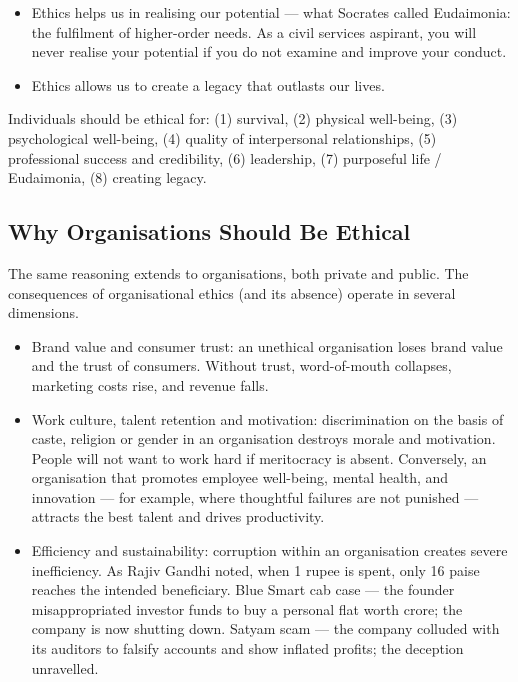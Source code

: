 \begin{KeyConcept}
\begin{itemize}
\item Ethics helps us in realising our potential --- what Socrates called Eudaimonia: the fulfilment of higher-order needs. As a civil services aspirant, you will never realise your potential if you do not examine and improve your conduct.
\item Ethics allows us to create a legacy that outlasts our lives.
\end{itemize}
\end{KeyConcept}

\begin{QuickRevision}
Individuals should be ethical for: (1) survival, (2) physical well-being, (3) psychological well-being, (4) quality of interpersonal relationships, (5) professional success and credibility, (6) leadership, (7) purposeful life / Eudaimonia, (8) creating legacy.
\end{QuickRevision}

\subsection{Why Organisations Should Be Ethical}

The same reasoning extends to organisations, both private and public. The consequences of organisational ethics (and its absence) operate in several dimensions.

\begin{itemize}
\item Brand value and consumer trust: an unethical organisation loses brand value and the trust of consumers. Without trust, word-of-mouth collapses, marketing costs rise, and revenue falls.
\item Work culture, talent retention and motivation: discrimination on the basis of caste, religion or gender in an organisation destroys morale and motivation. People will not want to work hard if meritocracy is absent. Conversely, an organisation that promotes employee well-being, mental health, and innovation --- for example, where thoughtful failures are not punished --- attracts the best talent and drives productivity.
\item Efficiency and sustainability: corruption within an organisation creates severe inefficiency. As Rajiv Gandhi noted, when 1 rupee is spent, only 16 paise reaches the intended beneficiary. Blue Smart cab case --- the founder misappropriated investor funds to buy a personal flat worth  crore; the company is now shutting down. Satyam scam --- the company colluded with its auditors to falsify accounts and show inflated profits; the deception unravelled.
\end{itemize}

